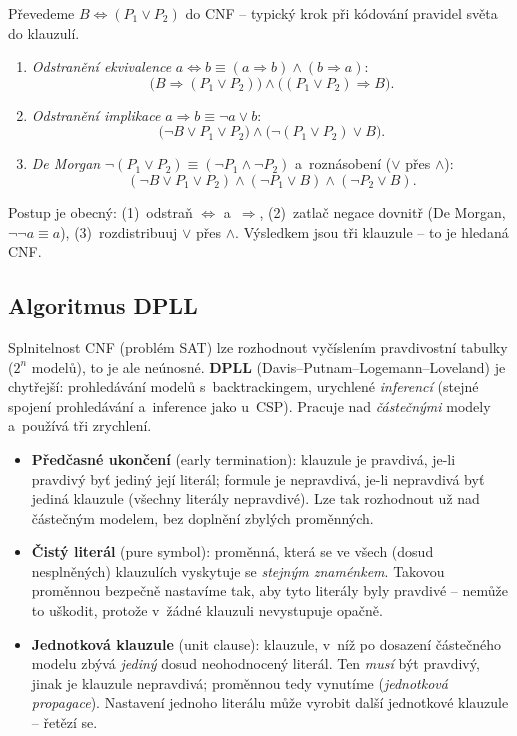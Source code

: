 \begin{priklad}
Převedeme $B \Leftrightarrow (P_1\vee P_2)$ do CNF -- typický krok při kódování pravidel světa do klauzulí.
\begin{enumerate}
  \item \emph{Odstranění ekvivalence} $a\Leftrightarrow b \equiv (a\Rightarrow b)\wedge(b\Rightarrow a)$:
  \[ \bigl(B\Rightarrow(P_1\vee P_2)\bigr)\wedge\bigl((P_1\vee P_2)\Rightarrow B\bigr). \]
  \item \emph{Odstranění implikace} $a\Rightarrow b \equiv \neg a\vee b$:
  \[ \bigl(\neg B\vee P_1\vee P_2\bigr)\wedge\bigl(\neg(P_1\vee P_2)\vee B\bigr). \]
  \item \emph{De Morgan} $\neg(P_1\vee P_2)\equiv(\neg P_1\wedge\neg P_2)$ a~roznásobení ($\vee$ přes $\wedge$):
  \[ \boxed{(\neg B\vee P_1\vee P_2)\wedge(\neg P_1\vee B)\wedge(\neg P_2\vee B)}. \]
\end{enumerate}
Postup je obecný: (1)~odstraň $\Leftrightarrow$ a~$\Rightarrow$, (2)~zatlač negace dovnitř (De Morgan, $\neg\neg a\equiv a$), (3)~rozdistribuuj $\vee$ přes $\wedge$. Výsledkem jsou tři klauzule -- to je hledaná CNF.
\end{priklad}

\subsection{Algoritmus DPLL}

Splnitelnost CNF (problém SAT) lze rozhodnout vyčíslením pravdivostní tabulky ($2^n$ modelů), to je ale neúnosné. \textbf{DPLL} (Davis--Putnam--Logemann--Loveland) je chytřejší: prohledávání modelů s~backtrackingem, urychlené \emph{inferencí} (stejné spojení prohledávání a~inference jako u~CSP). Pracuje nad \emph{částečnými} modely a~používá tři zrychlení.

\begin{definice}
\begin{itemize}
  \item \textbf{Předčasné ukončení} (early termination): klauzule je pravdivá, je-li pravdivý byť jediný její literál; formule je nepravdivá, je-li nepravdivá byť jediná klauzule (všechny literály nepravdivé). Lze tak rozhodnout už nad částečným modelem, bez doplnění zbylých proměnných.
  \item \textbf{Čistý literál} (pure symbol): proměnná, která se ve všech (dosud nesplněných) klauzulích vyskytuje se \emph{stejným znaménkem}. Takovou proměnnou bezpečně nastavíme tak, aby tyto literály byly pravdivé -- nemůže to uškodit, protože v~žádné klauzuli nevystupuje opačně.
  \item \textbf{Jednotková klauzule} (unit clause): klauzule, v~níž po dosazení částečného modelu zbývá \emph{jediný} dosud neohodnocený literál. Ten \emph{musí} být pravdivý, jinak je klauzule nepravdivá; proměnnou tedy vynutíme (\emph{jednotková propagace}). Nastavení jednoho literálu může vyrobit další jednotkové klauzule -- řetězí se.
\end{itemize}
\end{definice}

